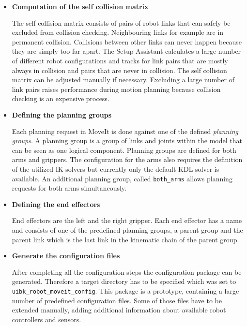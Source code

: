 \begin{itemize}

\item \textbf{Computation of the self collision matrix}

The self collision matrix consists of pairs of robot links that can safely be excluded from collision checking. Neighbouring links for example are in permanent collision. Collisions between other links can never happen because they are simply too far apart. The Setup Assistant calculates a large number of different robot configurations and tracks for link pairs that are mostly always in collision and pairs that are never in collision. The self collision matrix can be adjusted manually if necessary. Excluding a large number of link pairs raises performance during motion planning because collision checking is an expensive process.

\item \textbf{Defining the planning groups}

Each planning request in MoveIt is done against one of the defined \emph{planning groups}. A planning group is a group of links and joints within the model that can be seen as one logical component. Planning groups are defined for both arms and grippers. The configuration for the arms also requires the definition of the utilized IK solvers but currently only the default KDL solver is available. An additional planning group, called \texttt{both\_arms} allows planning requests for both arms simultaneously.

\item \textbf{Defining the end effectors}

End effectors are the left and the right gripper. Each end effector has a name and consists of one of the predefined planning groups, a parent group and the parent link which is the last link in the kinematic chain of the parent group.

\item \textbf{Generate the configuration files}

After completing all the configuration steps the configuration package can be generated. Therefore a target directory has to be specified which was set to \texttt{uibk\_robot\_moveit\_config}. This package is a prototype, containing a large number of predefined configuration files. Some of those files have to be extended manually, adding additional information about available robot controllers and sensors. 

\end{itemize}


